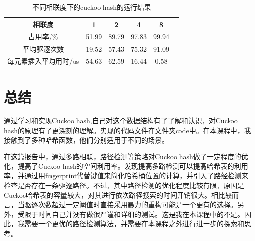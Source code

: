 \documentclass[supercite]{Experimental_Report}
\theoremstyle{definition}
\begin{document}
\begin{table}[htbp]
\caption{不同相联度下的cuckoo hash的运行结果}
\label{tab4-1}
\setlength{\tabcolsep}{6.8mm}
\begin{tabular}{cccccc}
   \toprule
     相联度& 1 & 2 & 4 & 8\\
   \midrule
占用率/\% & 51.99 & 89.79 & 97.83& 99.94	  \\
平均驱逐次数& 19.52 & 57.43 & 75.32 & 91.09  \\
每元素插入平均用时/us & 54.63 & 62.59 & 16.44 & 0.58 \\
   \bottomrule
\end{tabular}
\end{table}

\newpage

\section{总结}

通过学习和实现Cuckoo hash,自己对这个数据结构有了了解和认识，对Cuckoo hash的原理有了更深刻的理解。实现的代码文件在文件夹code中。在本课程中，我接触到了多种哈希函数，他们分别适用于不同的场景。

在这篇报告中，通过多路相联，路径检测等策略对Cuckoo hash做了一定程度的优化，提高了Cuckoo hash的空间利用率。发现提高多路检测可以提高哈希表的利用率，并通过用fingerprint代替键值来简化哈希桶位置的计算，并引入了路经检测来检查是否存在一条驱逐路径。不过，其中路径检测的优化程度比较有限，原因是Cuckoo哈希表的容量较大，对其进行依次路径搜索的时间开销很大。相比较而言，当驱逐次数超过一定阈值时直接采用暴力的重构可能是一个更有的选择。另外，受限于时间自己并没有做很严谨和详细的测试。这是我在本课程中的不足。因此，我需要一个更优的路径检测算法，并需要在本课程之外进行进一步的探索和思考。


\newpage

\clearpage
\end{document}
